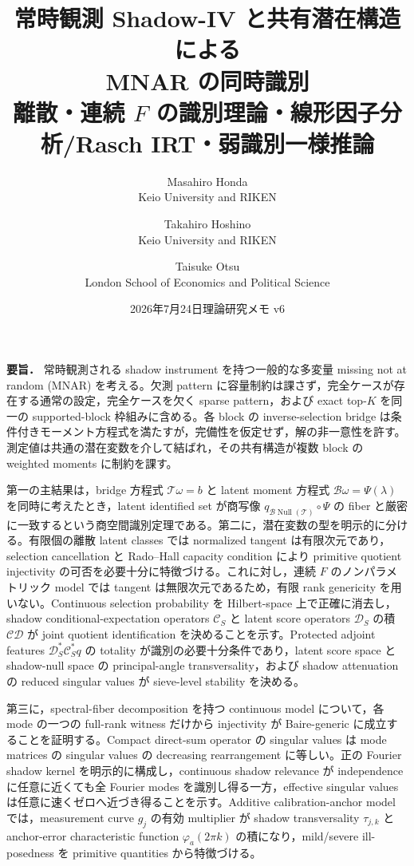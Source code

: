 \documentclass[11pt,a4paper]{ltjsarticle}
\title{\vspace{-1.4cm}
{\color{navy}\bfseries 常時観測 Shadow-IV と共有潜在構造による\\
MNAR の同時識別}\\[2mm]
{\large 離散・連続 $F$ の識別理論・線形因子分析/Rasch IRT・弱識別一様推論}}
\author{
Masahiro Honda\\[-1mm]
{\small Keio University and RIKEN}
\and
Takahiro Hoshino\\[-1mm]
{\small Keio University and RIKEN}
\and
Taisuke Otsu\\[-1mm]
{\small London School of Economics and Political Science}
}
\date{2026年7月24日\quad 理論研究メモ v6}
\theoremstyle{remark}
\newcommand{\Top}{\mathscr T}
\newcommand{\Bop}{\mathscr B}
\newcommand{\Cop}{\mathscr C}
\newcommand{\Jcal}{\mathscr D}
\newcommand{\Null}{\operatorname{Null}}
\begin{document}
\maketitle

\begin{tcolorbox}[colback=softblue,colframe=accent,boxrule=.8pt,arc=2mm]
\textbf{要旨．}
常時観測される shadow instrument を持つ一般的な多変量 missing not at random (MNAR) を考える。欠測 pattern に容量制約は課さず，完全ケースが存在する通常の設定，完全ケースを欠く sparse pattern，および exact top-$K$ を同一の supported-block 枠組みに含める。各 block の inverse-selection bridge は条件付きモーメント方程式を満たすが，完備性を仮定せず，解の非一意性を許す。測定値は共通の潜在変数を介して結ばれ，その共有構造が複数 block の weighted moments に制約を課す。

第一の主結果は，bridge 方程式 $\Top\omega=b$ と latent moment 方程式 $\Bop\omega=\Psi(\lambda)$ を同時に考えたとき，latent identified set が商写像 $q_{\Bop\Null(\Top)}\circ\Psi$ の fiber と厳密に一致するという商空間識別定理である。第二に，潜在変数の型を明示的に分ける。有限個の離散 latent classes では normalized tangent は有限次元であり，selection cancellation と Rado--Hall capacity condition により primitive quotient injectivity の可否を必要十分に特徴づける。これに対し，連続 $F$ のノンパラメトリック model では tangent は無限次元であるため，有限 rank genericity を用いない。Continuous selection probability を Hilbert-space 上で正確に消去し，shadow conditional-expectation operators $\Cop_S$ と latent score operators $\Jcal_S$ の積 $\Cop\Jcal$ が joint quotient identification を決めることを示す。Protected adjoint features $\Jcal_S^*\Cop_S^*q$ の totality が識別の必要十分条件であり，latent score space と shadow-null space の principal-angle transversality，および shadow attenuation の reduced singular values が sieve-level stability を決める。

第三に，spectral-fiber decomposition を持つ continuous model について，各 mode の一つの full-rank witness だけから injectivity が Baire-generic に成立することを証明する。Compact direct-sum operator の singular values は mode matrices の singular values の decreasing rearrangement に等しい。正の Fourier shadow kernel を明示的に構成し，continuous shadow relevance が independence に任意に近くても全 Fourier modes を識別し得る一方，effective singular values は任意に速くゼロへ近づき得ることを示す。Additive calibration-anchor model では，measurement curve $g_j$ の有効 multiplier が shadow transversality $\tau_{j,k}$ と anchor-error characteristic function $\varphi_a(2\pi k)$ の積になり，mild/severe ill-posedness を primitive quantities から特徴づける。


\end{tcolorbox}
\end{document}
